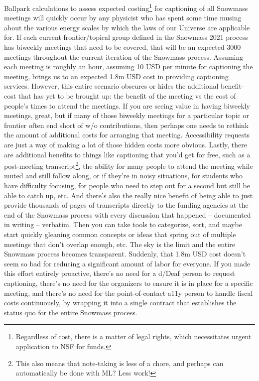 \documentclass{article}
\begin{document}
  Ballpark calculations to assess expected costing\footnote{Regardless of cost, there is a matter of legal rights, which necessitates urgent application to NSF for funds.} for captioning of all Snowmass meetings will quickly occur by any physicist who has spent some time musing about the various energy scales by which the laws of our Universe are applicable for. If each current frontier/topical group defined in the Snowmass 2021 process has biweekly meetings that need to be covered, that will be an expected 3000 meetings throughout the current iteration of the Snowmass process. Assuming each meeting is roughly an hour, assuming 10 USD per minute for captioning the meeting, brings us to an expected 1.8m USD cost in providing captioning services. However, this entire scenario obscures or hides the additional benefit-cost that has yet to be brought up: the benefit of the meeting vs the cost of people's times to attend the meetings. If you are seeing value in having biweekly meetings, great, but if many of those biweekly meetings for a particular topic or frontier often end short of w/o contributions, then perhaps one needs to rethink the amount of additional costs for arranging that meeting. Accessibility requests are just a way of making a lot of those hidden costs more obvious. Lastly, there are additional benefits to things like captioning that you'd get for free, such as a post-meeting transcript\footnote{This also means that note-taking is less of a chore, and perhaps can automatically be done with ML? Less work!}, the ability for many people to attend the meeting while muted and still follow along, or if they're in noisy situations, for students who have difficulty focusing, for people who need to step out for a second but still be able to catch up, etc. And there's also the really nice benefit of being able to just provide thousands of pages of transcripts directly to the funding agencies at the end of the Snowmass process with every discussion that happened -- documented in writing -- verbatim. Then you can take tools to categorize, sort, and maybe start quickly gleaning common concepts or ideas that spring out of multiple meetings that don't overlap enough, etc. The sky is the limit and the entire Snowmass process becomes transparent. Suddenly, that 1.8m USD cost doesn't seem so bad for reducing a significant amount of labor for everyone. If you made this effort entirely proactive, there's no need for a d/Deaf person to request captioning, there's no need for the organizers to ensure it is in place for a specific meeting, and there's no need for the point-of-contact a11y person to handle fiscal costs continuously, by wrapping it into a single contract that establishes the status quo for the entire Snowmass process.
\end{document}
